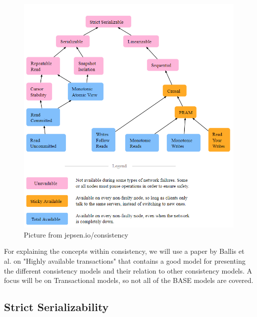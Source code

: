 \documentclass[a4paper,10pt,titlepage]{report}
\begin{document}
\begin{figure}
    \centering
    \includegraphics[scale=0.4]{images/consistency models.PNG}
    \caption{Picture from jepsen.io/consistency}
    \label{fig:jepsenioconsistency}
\end{figure}
For explaining the concepts within consistency, we will use a paper by Ballis et al. on "Highly available transactions"\cite{HighlyAvailableTransactionsVirtuesandLimitations} that contains a good model for presenting the different consistency models and their relation to other consistency models. A focus will be on Transactional models, so not all of the BASE models are covered.\\

\subsection{Strict Serializability}
\end{document}
